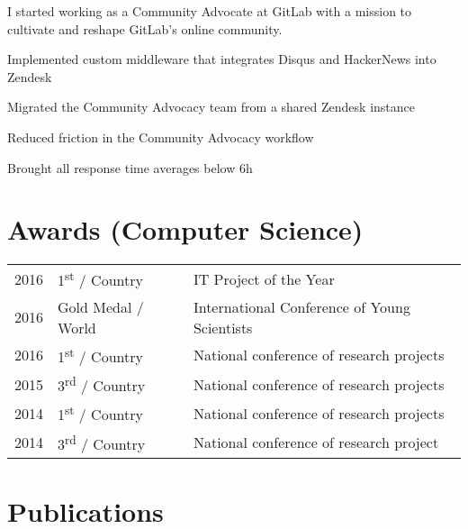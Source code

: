 \documentclass[]{matija-resume}
\begin{document}
\begin{minipage}[t]{0.66\textwidth}
\vspace{\topsep}
I started working as a Community Advocate at GitLab with a mission to cultivate and reshape GitLab's online community.
\vspace{\topsep}
\begin{tightemize}
\item Implemented custom middleware that integrates Disqus and HackerNews into Zendesk
\item Migrated the Community Advocacy team from a shared Zendesk instance
\item Reduced friction in the Community Advocacy workflow
\item Brought all response time averages below 6h
\end{tightemize}
\sectionsep


\section{Awards (Computer Science)}
\begin{tabular}{rll}
2016 & 1\textsuperscript{st} / Country & IT Project of the Year\\
2016 & Gold Medal / World & International Conference of Young Scientists\\
2016 & 1\textsuperscript{st} / Country & National conference of research projects\\
2015 & 3\textsuperscript{rd} / Country & National conference of research projects\\
2014 & 1\textsuperscript{st} / Country & National conference of research projects\\
2014 & 3\textsuperscript{rd} / Country & National conference of research project
\end{tabular}
\sectionsep


\section{Publications}
\renewcommand\refname{\vskip -1.5em} %


\nocite{*}

\end{minipage}
\end{document}
